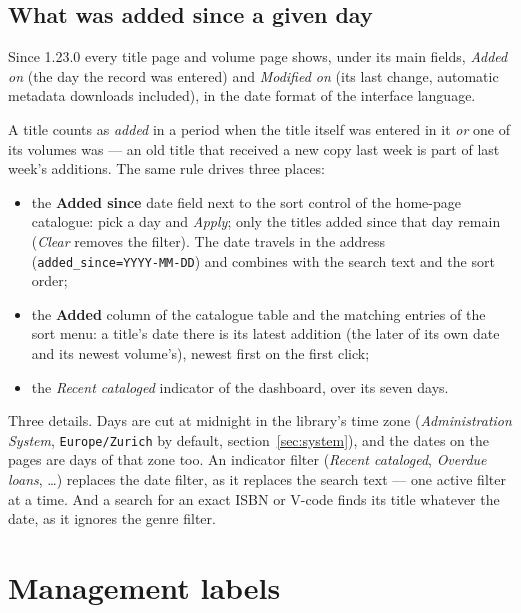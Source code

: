 \subsection{What was added since a given day}\label{sec:added-since}

Since 1.23.0 every title page and volume page shows, under its main
fields, \emph{Added on} (the day the record was entered) and
\emph{Modified on} (its last change, automatic metadata downloads
included), in the date format of the interface language.

A title counts as \emph{added} in a period when the title itself was
entered in it \emph{or} one of its volumes was --- an old title that
received a new copy last week is part of last week's additions. The
same rule drives three places:

\begin{itemize}
  \item the \textbf{Added since} date field next to the sort control
        of the home-page catalogue: pick a day and \emph{Apply}; only
        the titles added since that day remain (\emph{Clear} removes
        the filter). The date travels in the address
        (\texttt{added\_since=YYYY-MM-DD}) and combines with the
        search text and the sort order;
  \item the \textbf{Added} column of the catalogue table and the
        matching entries of the sort menu: a title's date there is its
        latest addition (the later of its own date and its newest
        volume's), newest first on the first click;
  \item the \emph{Recent cataloged} indicator of the dashboard, over
        its seven days.
\end{itemize}

\begin{note}
Three details. Days are cut at midnight in the library's time zone
(\emph{Administration \textrightarrow{} System}, \texttt{Europe/Zurich}
by default, section~\ref{sec:system}), and the dates on the pages are
days of that zone too. An indicator filter (\emph{Recent cataloged}, \emph{Overdue loans},
\dots) replaces the date filter, as it replaces the search text ---
one active filter at a time. And a search for an exact ISBN or V-code
finds its title whatever the date, as it ignores the genre filter.
\end{note}

\section{Management labels}\label{sec:management-labels}

